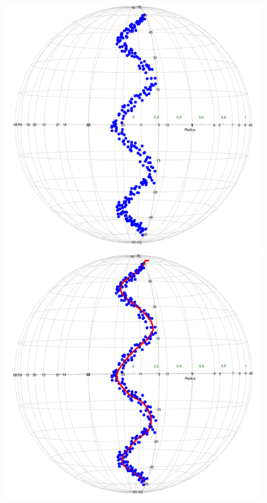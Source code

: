 \begin{figure}[h]
    \centering
    \includegraphics[scale=0.11]{figures/zigzag.png}
    \hspace{0cm}
    \includegraphics[scale=0.11]{figures/LPG(zigzag).png}
    \hspace{0cm}

\end{figure}
